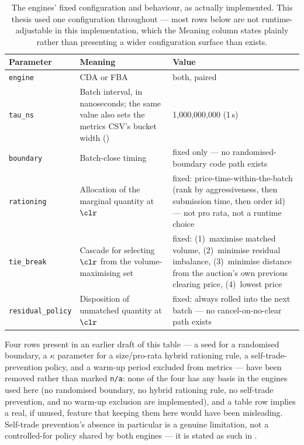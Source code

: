 \begin{table}[htbp]
\centering
\caption[Engine configuration]{The engines' fixed configuration and
behaviour, as actually implemented. This thesis used one configuration
throughout --- most rows below are not runtime-adjustable in this
implementation, which the Meaning column states plainly rather than presenting
a wider configuration surface than exists.}
\label{tab:config}
\small
\begin{tabularx}{\textwidth}{@{}p{3.2cm} L p{3.2cm}@{}}
\toprule
\textbf{Parameter} & \textbf{Meaning} & \textbf{Value}\\
\midrule
\texttt{engine}            & CDA or FBA & both, paired\\
\texttt{tau\_ns}           & Batch interval, in nanoseconds; the same
value also sets the metrics CSV's bucket width ()
& 1{,}000{,}000{,}000 (1\,s)\\
\texttt{boundary}          & Batch-close timing & fixed only --- no
randomised-boundary code path exists\\
\texttt{rationing}         & Allocation of the marginal quantity at
$\clr$ & fixed: price-time-within-the-batch (rank by aggressiveness,
then submission time, then order id) --- not pro rata, not a runtime
choice\\
\texttt{tie\_break}        & Cascade for selecting $\clr$ from the
volume-maximising set & fixed: (1)~maximise matched volume, (2)~minimise
residual imbalance, (3)~minimise distance from the auction's own
previous clearing price, (4)~lowest price\\
\texttt{residual\_policy}  & Disposition of unmatched quantity at $\clr$
& fixed: always rolled into the next batch --- no cancel-on-no-clear
path exists\\
\bottomrule
\end{tabularx}
\end{table}

Four rows present in an earlier draft of this table --- a seed for a
randomised boundary, a $\kappa$ parameter for a size/pro-rata hybrid
rationing rule, a self-trade-prevention policy, and a warm-up period
excluded from metrics --- have been removed rather than marked
\texttt{n/a}: none of the four has any basis in the engines used here
(no randomised boundary, no hybrid rationing rule, no self-trade
prevention, and no warm-up exclusion are implemented), and a table row
implies a real, if unused, feature that keeping them here would have
been misleading. Self-trade prevention's absence in particular is a
genuine limitation, not a controlled-for policy shared by both engines
--- it is stated as such in .

